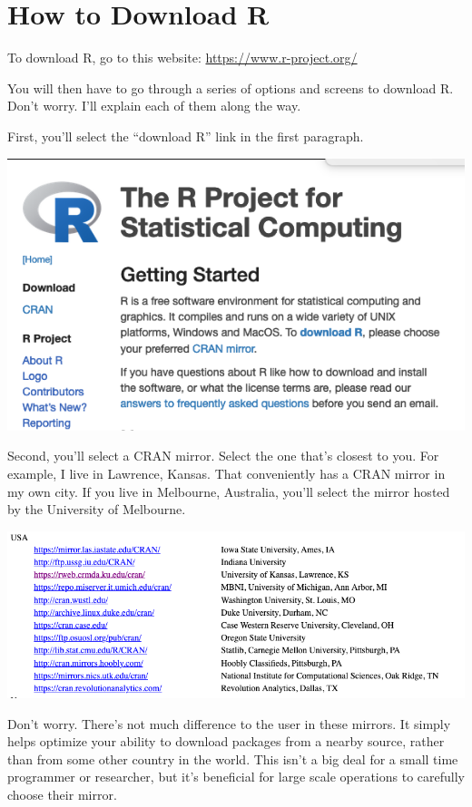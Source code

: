 \documentclass[
]{book}
\begin{document}
\hypertarget{how-to-download-r}{%
\section{How to Download R}\label{how-to-download-r}}

To download R, go to this website: \url{https://www.r-project.org/}

You will then have to go through a series of options and screens to download R. Don't worry. I'll explain each of them along the way.

First, you'll select the ``download R'' link in the first paragraph.

\begin{center}\includegraphics[width=0.5\linewidth]{1.1_R_Download} \end{center}

Second, you'll select a CRAN mirror. Select the one that's closest to you. For example, I live in Lawrence, Kansas. That conveniently has a CRAN mirror in my own city. If you live in Melbourne, Australia, you'll select the mirror hosted by the University of Melbourne.

\begin{center}\includegraphics[width=0.75\linewidth]{1.2_CRAN_Selection} \end{center}

Don't worry. There's not much difference to the user in these mirrors. It simply helps optimize your ability to download packages from a nearby source, rather than from some other country in the world. This isn't a big deal for a small time programmer or researcher, but it's beneficial for large scale operations to carefully choose their mirror.
\end{document}

